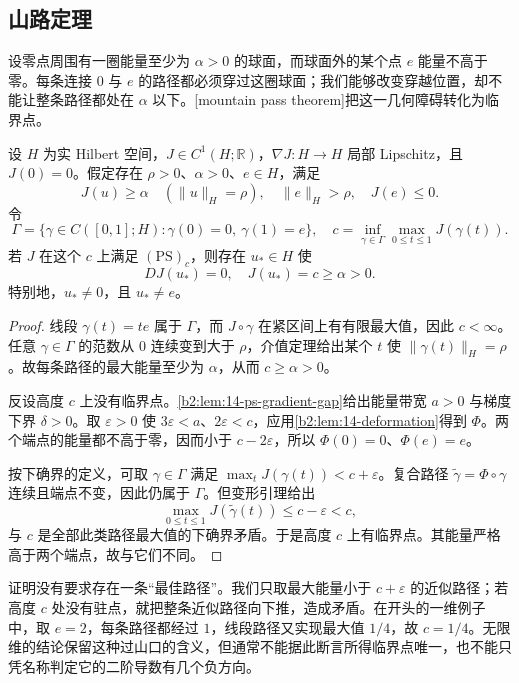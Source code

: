 \subsection{山路定理}
\label{b2:subsec:140503}

设零点周围有一圈能量至少为 \(\alpha>0\) 的球面，而球面外的某个点 \(e\) 能量不高于零。每条连接 \(0\) 与 \(e\) 的路径都必须穿过这圈球面；我们能够改变穿越位置，却不能让整条路径都处在 \(\alpha\) 以下。[mountain pass theorem]把这一几何障碍转化为临界点。

\begin{theorem}\label{b2:thm:14-mountain-pass}
设 \(H\) 为实 Hilbert 空间，\(J\in C^1(H;\mathbb R)\)，\(\nabla J:H\to H\) 局部 Lipschitz，且 \(J(0)=0\)。假定存在 \(\rho>0\)、\(\alpha>0\)、\(e\in H\)，满足
\[
 J(u)\ge\alpha\quad(\|u\|_H=\rho),
 \quad \|e\|_H>\rho,
 \quad J(e)\le0.
\]
令
\[
 \Gamma=\{\gamma\in C([0,1];H):\gamma(0)=0,\ \gamma(1)=e\},
 \quad c=\inf_{\gamma\in\Gamma}\max_{0\le t\le1}J(\gamma(t)).
\]
若 \(J\) 在这个 \(c\) 上满足 \((\mathrm{PS})_c\)，则存在 \(u_*\in H\) 使
\[
 DJ(u_*)=0,\quad J(u_*)=c\ge\alpha>0.
\]
特别地，\(u_*\ne0\)，且 \(u_*\ne e\)。
\end{theorem}
\begin{proof}
线段 \(\gamma(t)=te\) 属于 \(\Gamma\)，而 \(J\circ\gamma\) 在紧区间上有有限最大值，因此 \(c<\infty\)。任意 \(\gamma\in\Gamma\) 的范数从 \(0\) 连续变到大于 \(\rho\)，介值定理给出某个 \(t\) 使 \(\|\gamma(t)\|_H=\rho\)。故每条路径的最大能量至少为 \(\alpha\)，从而 \(c\ge\alpha>0\)。

反设高度 \(c\) 上没有临界点。\cref{b2:lem:14-ps-gradient-gap}给出能量带宽 \(a>0\) 与梯度下界 \(\delta>0\)。取 \(\varepsilon>0\) 使 \(3\varepsilon<a\)、\(2\varepsilon<c\)，应用\cref{b2:lem:14-deformation}得到 \(\Phi\)。两个端点的能量都不高于零，因而小于 \(c-2\varepsilon\)，所以 \(\Phi(0)=0\)、\(\Phi(e)=e\)。

按下确界的定义，可取 \(\gamma\in\Gamma\) 满足 \(\max_tJ(\gamma(t))<c+\varepsilon\)。复合路径 \(\widetilde\gamma=\Phi\circ\gamma\) 连续且端点不变，因此仍属于 \(\Gamma\)。但变形引理给出
\[
 \max_{0\le t\le1}J(\widetilde\gamma(t))\le c-\varepsilon<c,
\]
与 \(c\) 是全部此类路径最大值的下确界矛盾。于是高度 \(c\) 上有临界点。其能量严格高于两个端点，故与它们不同。
\end{proof}

证明没有要求存在一条“最佳路径”。我们只取最大能量小于 \(c+\varepsilon\) 的近似路径；若高度 \(c\) 处没有驻点，就把整条近似路径向下推，造成矛盾。在开头的一维例子中，取 \(e=2\)，每条路径都经过 \(1\)，线段路径又实现最大值 \(1/4\)，故 \(c=1/4\)。无限维的结论保留这种过山口的含义，但通常不能据此断言所得临界点唯一，也不能只凭名称判定它的二阶导数有几个负方向。


